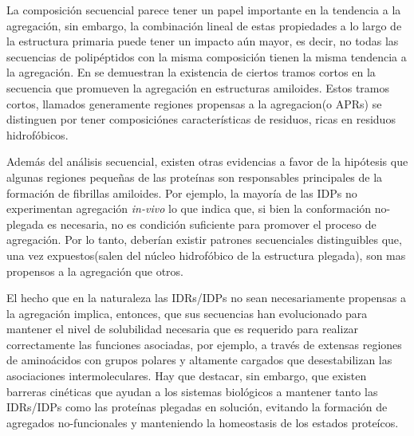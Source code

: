 La composición secuencial parece tener un papel importante en la tendencia a la agregación, sin embargo, la combinación lineal de estas propiedades a lo largo de la estructura
primaria puede tener un impacto aún mayor, es decir, no todas las secuencias de polipéptidos con la misma composición tienen la misma tendencia a la agregación.
En \cite{ventura2004short} se demuestran la existencia de ciertos tramos cortos en la secuencia que promueven la agregación en estructuras amiloides.
Estos tramos cortos, llamados generamente regiones propensas a la agregacion(o APRs) se distinguen por tener composiciónes características de residuos, ricas en residuos hidrofóbicos.

Además del análisis secuencial, existen otras evidencias a favor de la hipótesis que algunas regiones pequeñas de las proteínas son responsables principales de la formación de fibrillas amiloides. 
Por ejemplo, la mayoría de las IDPs no experimentan agregación \textit{in-vivo}\cite{linding2004comparative} lo que indica que, si bien la conformación no-plegada es necesaria, no es condición suficiente 
para promover el proceso de agregación.
Por lo tanto, deberían existir patrones secuenciales distinguibles que, una vez expuestos(salen del núcleo hidrofóbico de la estructura plegada), son mas propensos a la agregación que otros.  

El hecho que en la naturaleza las IDRs/IDPs no sean necesariamente propensas a la agregación implica, entonces, que sus secuencias han evolucionado para mantener el nivel de solubilidad necesaria que es requerido para 
realizar correctamente las funciones asociadas, por ejemplo, a través de extensas regiones de aminoácidos con grupos polares y altamente cargados que desestabilizan las asociaciones intermoleculares.
Hay que destacar, sin embargo, que existen barreras cinéticas que ayudan a los sistemas biológicos a mantener tanto las IDRs/IDPs como las proteínas plegadas en solución, evitando la formación de agregados no-funcionales 
y manteniendo la homeostasis de los estados proteícos.

